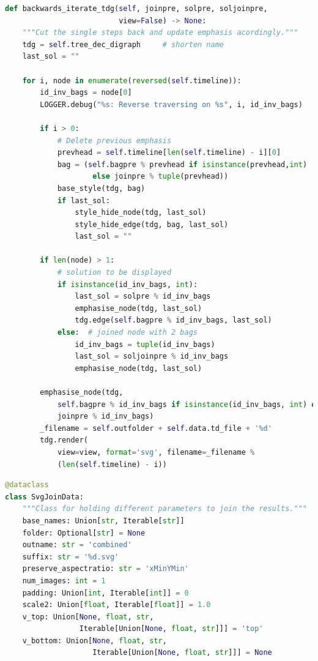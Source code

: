 \documentclass[a4paper, 12pt, bibliography=totoc]{scrartcl}
\begin{document}
\begin{lstlisting}[language={Python}, caption={backwards\_iterate\_tdg}, label={lst:backward-iterate}]
def backwards_iterate_tdg(self, joinpre, solpre, soljoinpre,
                          view=False) -> None:
	"""Cut the single steps back and update emphasis acordingly."""
	tdg = self.tree_dec_digraph     # shorten name
	last_sol = ""
	
	for i, node in enumerate(reversed(self.timeline)):
		id_inv_bags = node[0]
		LOGGER.debug("%s: Reverse traversing on %s", i, id_inv_bags)
		
		if i > 0:
			# Delete previous emphasis
			prevhead = self.timeline[len(self.timeline) - i][0]
			bag = (self.bagpre % prevhead if isinstance(prevhead,int) 
					else joinpre % tuple(prevhead))
			base_style(tdg, bag)
			if last_sol:
				style_hide_node(tdg, last_sol)
				style_hide_edge(tdg, bag, last_sol)
				last_sol = ""
		
		if len(node) > 1:
			# solution to be displayed
			if isinstance(id_inv_bags, int):
				last_sol = solpre % id_inv_bags
				emphasise_node(tdg, last_sol)
				tdg.edge(self.bagpre % id_inv_bags, last_sol)
			else:  # joined node with 2 bags
				id_inv_bags = tuple(id_inv_bags)
				last_sol = soljoinpre % id_inv_bags
				emphasise_node(tdg, last_sol)
			
		emphasise_node(tdg,
			self.bagpre % id_inv_bags if isinstance(id_inv_bags, int) else 
			joinpre % id_inv_bags)
		_filename = self.outfolder + self.data.td_file + '%d'
		tdg.render(
			view=view, format='svg', filename=_filename %
			(len(self.timeline) - i))

\end{lstlisting}

\begin{lstlisting}[language={Python}, caption={SvgJoinData}, label={lst:svgjoindata}]
@dataclass
class SvgJoinData:
	"""Class for holding different parameters to join the results."""
	base_names: Union[str, Iterable[str]]
	folder: Optional[str] = None
	outname: str = 'combined'
	suffix: str = '%d.svg'
	preserve_aspectratio: str = 'xMinYMin'
	num_images: int = 1
	padding: Union[int, Iterable[int]] = 0
	scale2: Union[float, Iterable[float]] = 1.0
	v_top: Union[None, float, str, 
	             Iterable[Union[None, float, str]]] = 'top'
	v_bottom: Union[None, float, str, 
	                Iterable[Union[None, float, str]]] = None
\end{lstlisting}

\end{document}
